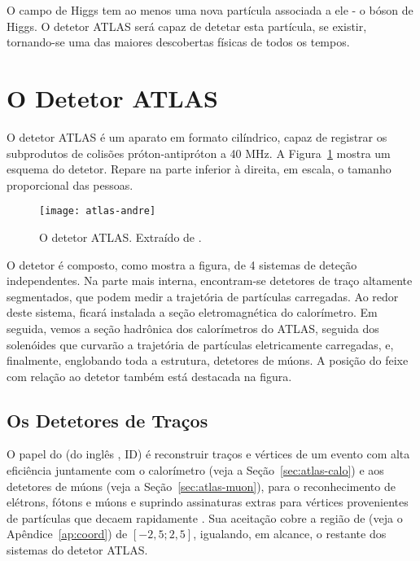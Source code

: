 O campo de Higgs tem ao menos uma nova partícula associada a ele - o bóson de
Higgs. O detetor ATLAS será capaz de detetar esta partícula, se existir,
tornando-se uma das maiores descobertas físicas de todos os tempos.

\section{O Detetor ATLAS}

O detetor ATLAS é um aparato em formato cilíndrico, capaz de registrar os
subprodutos de colisões próton-antipróton a 40 MHz. A
Figura~\ref{fig:atlas-scheme} mostra um esquema do detetor. Repare na parte
inferior à direita, em escala, o tamanho proporcional das pessoas.

\begin{figure}
\begin{center}
\texttt{[image: atlas-andre]}
\end{center}
\caption{O detetor ATLAS. Extraído de \cite{cern}.}
\label{fig:atlas-scheme}
\end{figure}

O detetor  é composto, como mostra a figura, de 4 sistemas de
deteção independentes. Na parte mais interna, encontram-se detetores de traço
altamente segmentados, que podem medir a trajetória de partículas
carregadas. Ao redor deste sistema, ficará instalada a seção eletromagnética
do calorímetro. Em seguida, vemos a seção hadrônica dos calorímetros do ATLAS,
seguida dos solenóides que curvarão a trajetória de partículas eletricamente
carregadas, e, finalmente, englobando toda a estrutura, detetores de múons. A
posição do feixe com relação ao detetor também está destacada na figura.

\subsection{Os Detetores de Traços}
\label{sec:atlas-id}

O papel do  (do inglês , ID) é
reconstruir traços e vértices de um evento com alta eficiência juntamente com
o calorímetro (veja a Seção~\ref{sec:atlas-calo}) e aos detetores de múons
(veja a Seção~\ref{sec:atlas-muon}), para o reconhecimento de elétrons, fótons
e múons e suprindo assinaturas extras para vértices provenientes de partículas
que decaem rapidamente \cite{atlas-id-tdr}. Sua aceitação cobre a região de
 (veja o Apêndice~\ref{ap:coord}) de $[-2,5; 2,5]$,
igualando, em alcance, o restante dos sistemas do detetor ATLAS.

